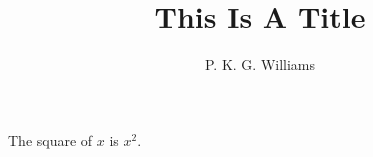 \documentclass{article}
\title{This Is A Title}
\author{P. K. G. Williams}
\begin{document}
The square of $x$ is $x^2$.
\end{document}
